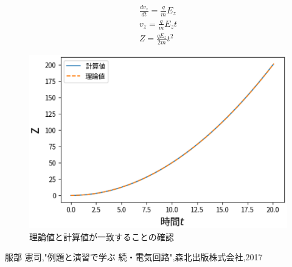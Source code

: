 \documentclass[a4j]{jarticle}
\begin{document}
          \begin{eqnarray}
              \frac{dv_z}{dt} = \frac{q}{m}E_z \\
              v_z = \frac{q}{m}E_z t \\
              Z = \frac{q E_z}{2m}t^2 \label{zz}
          \end{eqnarray}

          \begin{figure}[H]
            \centering
            \includegraphics[scale=0.7]{b05e1th.eps}
            \caption{理論値と計算値が一致することの確認}
            \label{b05e1th}
            \end{figure}

        \begin{thebibliography}{9}
           服部 憲司,"例題と演習で学ぶ 続・電気回路",森北出版株式会社,2017 
          \end{thebibliography}
\end{document}
